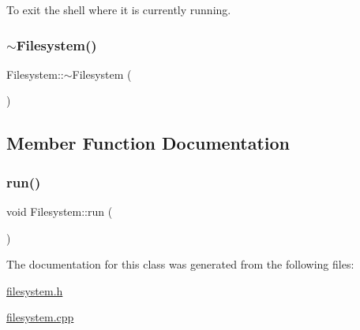 To exit the shell where it is currently running. 

\mbox{\label{class_filesystem_a8d4d73d3d4e56fd6792bdb83f6c5dfd8}} 
\subsubsection{\texorpdfstring{$\sim$\+Filesystem()}{~Filesystem()}}
{\footnotesize\ttfamily Filesystem\+::$\sim$\+Filesystem (\begin{DoxyParamCaption}{ }\end{DoxyParamCaption})\hspace{0.3cm}{\ttfamily [inline]}}



\subsection{Member Function Documentation}
\mbox{\label{class_filesystem_a373c34da491ec8d269cbc18d52a1ad79}} 
\subsubsection{\texorpdfstring{run()}{run()}}
{\footnotesize\ttfamily void Filesystem\+::run (\begin{DoxyParamCaption}{ }\end{DoxyParamCaption})}



The documentation for this class was generated from the following files\+:\begin{DoxyCompactItemize}
\item 
\hyperlink{filesystem_8h}{filesystem.\+h}\item 
\hyperlink{filesystem_8cpp}{filesystem.\+cpp}\end{DoxyCompactItemize}
